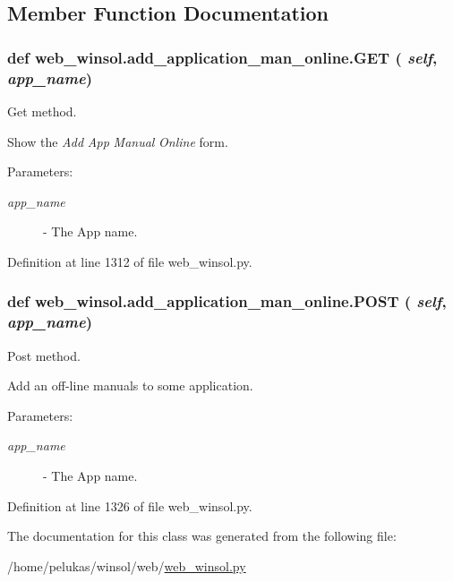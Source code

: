 \subsection{Member Function Documentation}
\hypertarget{classweb__winsol_1_1add__application__man__online_3459d36b0931656aaa284c8bc5dbda54}{
\subsubsection[GET]{\setlength{\rightskip}{0pt plus 5cm}def web\_\-winsol.add\_\-application\_\-man\_\-online.GET ( {\em self},  {\em app\_\-name})}}
\label{classweb__winsol_1_1add__application__man__online_3459d36b0931656aaa284c8bc5dbda54}


Get method. 

Show the {\em Add\/} {\em App\/} {\em Manual\/} {\em Online\/} form.

\begin{Desc}
\item[Parameters:]
\begin{description}
\item[{\em app\_\-name}]- The App name. \end{description}
\end{Desc}


Definition at line 1312 of file web\_\-winsol.py.\hypertarget{classweb__winsol_1_1add__application__man__online_b1582e9918f3a88e7caa44d111806f8b}{
\subsubsection[POST]{\setlength{\rightskip}{0pt plus 5cm}def web\_\-winsol.add\_\-application\_\-man\_\-online.POST ( {\em self},  {\em app\_\-name})}}
\label{classweb__winsol_1_1add__application__man__online_b1582e9918f3a88e7caa44d111806f8b}


Post method. 

Add an off-line manuals to some application.

\begin{Desc}
\item[Parameters:]
\begin{description}
\item[{\em app\_\-name}]- The App name. \end{description}
\end{Desc}


Definition at line 1326 of file web\_\-winsol.py.

The documentation for this class was generated from the following file:\begin{CompactItemize}
\item 
/home/pelukas/winsol/web/\hyperlink{web__winsol_8py}{web\_\-winsol.py}\end{CompactItemize}
